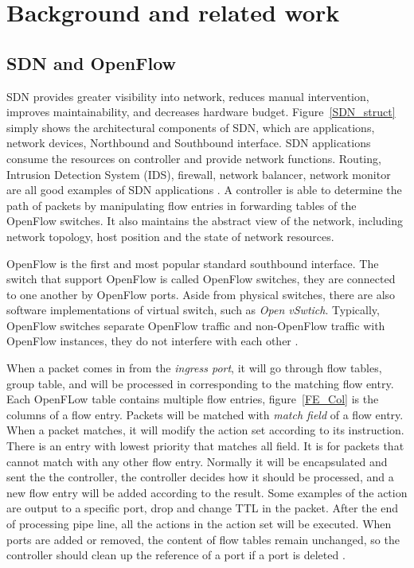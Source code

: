 \chapter{Background and related work}
\section{SDN and OpenFlow}
SDN provides greater visibility into network, reduces manual intervention, improves maintainability, and decreases hardware budget. Figure~\ref{SDN_struct} simply shows the architectural components of SDN, which are applications, network devices, Northbound and Southbound interface. SDN applications consume the resources on controller and provide network functions. Routing, Intrusion Detection System (IDS), firewall, network balancer, network monitor are all good examples of SDN applications \cite{SPYFGT13}. A controller is able to determine the path of packets by manipulating flow entries in forwarding tables of the OpenFlow switches. It also maintains the abstract view of the network, including network topology, host position and the state of network resources.

OpenFlow is the first and most popular standard southbound interface. The switch that support OpenFlow is called OpenFlow switches, they are connected to one another by OpenFlow ports. Aside from physical switches, there are also software implementations of virtual switch, such as \textit{Open vSwtich}. Typically, OpenFlow switches separate OpenFlow traffic and non-OpenFlow traffic with OpenFlow instances, they do not interfere with each other \cite{HP_SPEC}.

When a packet comes in from the \textit{ingress port}, it will go through flow tables, group table, and will be processed in corresponding to the matching flow entry. Each OpenFLow table contains multiple flow entries, figure~\ref{FE_Col} is the columns of a flow entry. Packets will be matched with \textit{match field} of a flow entry. When a packet matches, it will modify the action set according to its instruction. There is an entry with lowest priority that matches all field. It is for packets that cannot match with any other flow entry. Normally it will be encapsulated and sent the the controller, the controller decides how it should be processed, and a new flow entry will be added according to the result. Some examples of the action are output to a specific port, drop and change TTL in the packet. After the end of processing pipe line, all the actions in the action set will be executed. When ports are added or removed, the content of flow tables remain unchanged, so the controller should clean up the reference of a port if a port is deleted \cite{OF_SPEC}.

